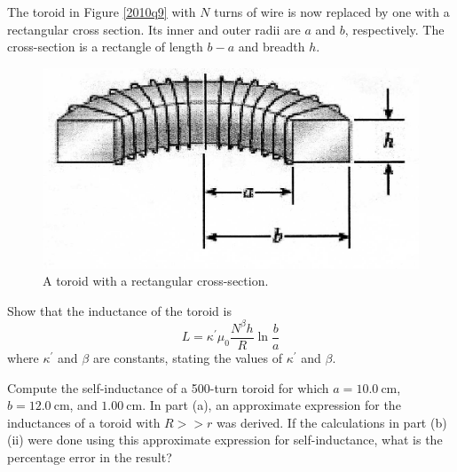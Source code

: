 \begin{problem}
    \begin{partproblem}
        The toroid in Figure \ref{2010q9} with $N$ turns of wire is now replaced by one with a rectangular cross section. Its inner and outer radii are $a$ and $b$, respectively. The cross-section is a rectangle of length $b-a$ and breadth $h$.
        \begin{figure}[h]
	          \centering
	        \includegraphics[width=0.8\linewidth]{spho_book_TYS_images/2010q9_2.png}
	        \caption{A toroid with a rectangular cross-section.} \label{2010q9_2}
        \end{figure}
        \begin{subproblem}
            Show that the inductance of the toroid is
            \[L=\kappa^{\prime} \mu_{0} \frac{N^{\beta} h}{R} \ln \frac{b}{a}\]
            where $\kappa^{\prime}$ and $\beta$ are constants, stating the values of $\kappa^{\prime}$ and $\beta$.
        \end{subproblem}

        \begin{subproblem}
            Compute the self-inductance of a 500-turn toroid for which $a=\qty{10.0}{\cm}$, $b=\qty{12.0}{\cm}$, and $\qty{1.00}{\cm}$. In part (a), an approximate expression for the inductances of a toroid with $R>>r$ was derived. If the calculations in part (b) (ii) were done using this approximate expression for self-inductance, what is the percentage error in the result?
        \end{subproblem}
    \end{partproblem}
\end{problem}

